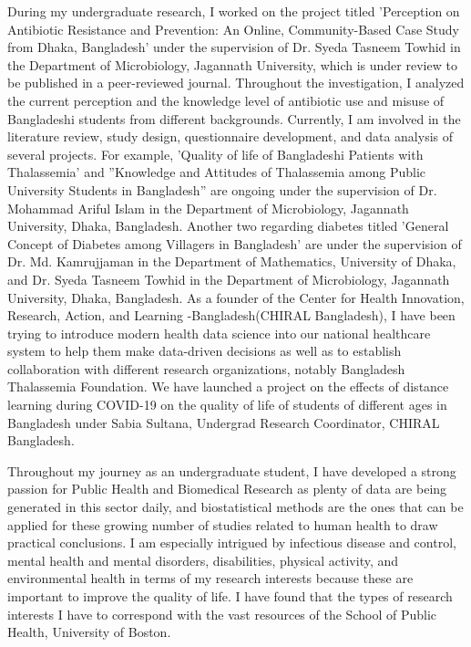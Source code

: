 \documentclass[11pt, a4paper]{article}
\begin{document}
During my undergraduate research, I worked on the project titled 'Perception on Antibiotic Resistance and Prevention: An Online, Community-Based Case Study from Dhaka, Bangladesh' under the supervision of Dr. Syeda Tasneem Towhid in the Department of Microbiology, Jagannath University, which is under review to be published in a peer-reviewed journal. Throughout the investigation, I analyzed the current perception and the knowledge level of antibiotic use and misuse of Bangladeshi students from different backgrounds. Currently, I am involved in the literature review, study design, questionnaire development, and data analysis of several projects. For example, 'Quality of life of Bangladeshi Patients with Thalassemia' and ”Knowledge and Attitudes of Thalassemia among Public University Students in Bangladesh” are ongoing under the supervision of Dr. Mohammad Ariful Islam in the Department of Microbiology, Jagannath University, Dhaka, Bangladesh. Another two regarding diabetes titled 'General Concept of Diabetes among Villagers in Bangladesh' are under the supervision of Dr. Md. Kamrujjaman in the Department of Mathematics, University of Dhaka, and Dr. Syeda Tasneem Towhid in the Department of Microbiology, Jagannath University, Dhaka, Bangladesh. As a founder of the Center for Health Innovation, Research, Action, and Learning -Bangladesh(CHIRAL Bangladesh), I have been trying to introduce modern health data science into our national healthcare system to help them make data-driven decisions as well as to establish collaboration with different research organizations, notably Bangladesh Thalassemia Foundation. We have launched a project on the effects of distance learning during COVID-19 on the quality of life of students of different ages in Bangladesh under Sabia Sultana, Undergrad Research Coordinator, CHIRAL Bangladesh. 


\justify 
Throughout my journey as an undergraduate student, I have developed a strong passion for Public Health and Biomedical Research as plenty of data are being generated in this sector daily, and biostatistical methods are the ones that can be applied for these growing number of studies related to human health to draw practical conclusions. I am especially intrigued by infectious disease and control, mental health and mental disorders, disabilities, physical activity, and environmental health in terms of my research interests because these are important to improve the quality of life. I have found that the types of research interests I have to correspond with the vast resources of the School of Public Health, University of Boston. 
\end{document}
